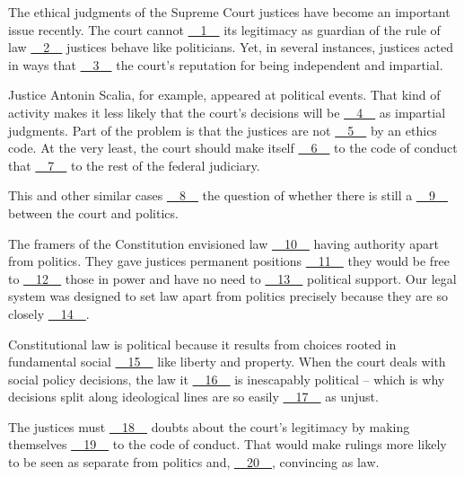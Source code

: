 The ethical judgments of the Supreme Court justices have become an important issue recently. The court cannot \uline{~~1~~} its legitimacy as guardian of the rule of  law \uline{~~2~~} justices behave like politicians. Yet, in several instances, justices acted in ways that \uline{~~3~~} the court's reputation for being independent and impartial.


Justice Antonin Scalia, for example, appeared at political events. That kind of activity makes it less likely that the court's decisions will be \uline{~~4~~} as impartial judgments. Part of the problem is that the justices are not \uline{~~5~~} by an ethics code.  At the very least, the court should make itself \uline{~~6~~} to the code of conduct  that \uline{~~7~~} to the rest of the federal judiciary.


This and other similar cases \uline{~~8~~} the question of whether there is still a \uline{~~9~~} between the court and politics.


The framers of the Constitution envisioned law \uline{~~10~~} having authority apart from politics. They gave justices permanent positions \uline{~~11~~} they would be free to \uline{~~12~~} those in power and have no need to \uline{~~13~~} political support. Our legal system was designed to set law apart from politics precisely because they are so closely \uline{~~14~~}.


Constitutional law is political because it results from choices rooted in fundamental social \uline{~~15~~} like liberty and property. When the court deals with  social policy decisions, the law it \uline{~~16~~} is inescapably political – which is why decisions split along ideological lines are so easily \uline{~~17~~} as unjust.


The justices must \uline{~~18~~} doubts about the court's legitimacy by making themselves \uline{~~19~~} to the code of conduct. That would make rulings more likely to be seen as separate from politics and, \uline{~~20~~}, convincing as law.